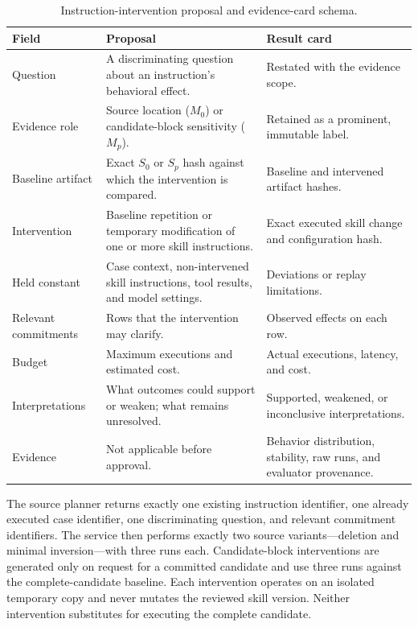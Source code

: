\begin{table}[t]
    \caption{Instruction-intervention proposal and evidence-card schema.}
    \label{tab:probe-schema}
    \small
    \begin{tabularx}{\textwidth}{@{}p{}Y Y@{}}
        \toprule
        \textbf{Field} & \textbf{Proposal} & \textbf{Result card} \\
        \midrule
        Question & A discriminating question about an instruction's behavioral effect. & Restated with the evidence scope. \\
        Evidence role & Source location ($M_0$) or candidate-block sensitivity ($M_p$). & Retained as a prominent, immutable label. \\
        Baseline artifact & Exact $S_0$ or $S_p$ hash against which the intervention is compared. & Baseline and intervened artifact hashes. \\
        Intervention & Baseline repetition or temporary modification of one or more skill instructions. & Exact executed skill change and configuration hash. \\
        Held constant & Case context, non-intervened skill instructions, tool results, and model settings. & Deviations or replay limitations. \\
        Relevant commitments & Rows that the intervention may clarify. & Observed effects on each row. \\
        Budget & Maximum executions and estimated cost. & Actual executions, latency, and cost. \\
        Interpretations & What outcomes could support or weaken; what remains unresolved. & Supported, weakened, or inconclusive interpretations. \\
        Evidence & Not applicable before approval. & Behavior distribution, stability, raw runs, and evaluator provenance. \\
        \bottomrule
    \end{tabularx}
\end{table}

The source planner returns exactly one existing instruction identifier, one already executed case identifier, one discriminating question, and relevant commitment identifiers. The service then performs exactly two source variants---deletion and minimal inversion---with three runs each. Candidate-block interventions are generated only on request for a committed candidate and use three runs against the complete-candidate baseline. Each intervention operates on an isolated temporary copy and never mutates the reviewed skill version. Neither intervention substitutes for executing the complete candidate.


